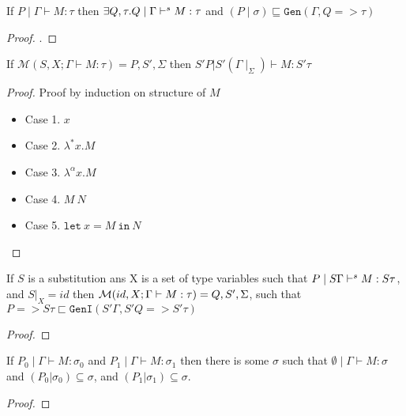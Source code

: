 \begin{thm}\label{thm:completeness-syntax-directed}
  If $P \mid \Gamma \vdash M:\tau$ then
  $\exists Q,\tau. Q \mid \Gamma \vdash^s M:\tau$
  and $(P \mid \sigma) \sqsubseteq \texttt{Gen}(\Gamma, Q => \tau)$
\end{thm}
\begin{proof}
  .
\end{proof}

\begin{thm}
   If $\mathcal{M}(S, X; \Gamma \vdash M : \tau) = P, S', \Sigma$ then $S' P | S' (\Gamma\mid_{\Sigma}) \vdash M : S' \tau$
\end{thm}
\begin{proof}
  Proof by induction on structure of $M$
  \begin{itemize}
  \item Case 1. $x$
  \item Case 2. $\lambda^{*} x. M$
  \item Case 3. $\lambda ^{\alpha}x. M$
  \item Case 4. $M\ N$
  \item Case 5. $\texttt{let}\ x = M\ \texttt{in}\ N$
  \end{itemize}
\end{proof}

\begin{thm}[Completeness of $\M$.]
  If $S$ is a substitution ans X is a set of type variables such that
  $P \mid S\Gamma \vdash^s M: S\tau$, and $S|_X = id$ then $\mathcal{M}(id, X; \Gamma \vdash M:\tau) = Q, S', \Sigma$, such that
  $P => S\tau \sqsubset \texttt{GenI}(S'\Gamma, S' Q => S' \tau)$
\end{thm}
\begin{proof}
\end{proof}

\begin{thm}
  If $P_0 \mid  \Gamma \vdash M : \sigma_0$ and $P_1 \mid  \Gamma \vdash M : \sigma_1$ then there is some $\sigma$ such that
  $\emptyset \mid \Gamma \vdash M : \sigma$ and $(P_0 | \sigma_0) \subseteq \sigma$, and $(P_1 | \sigma_1) \subseteq \sigma$.
\end{thm}
\begin{proof}
\end{proof}



